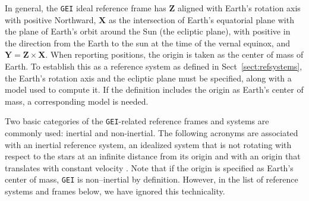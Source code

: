 \documentclass[draft]{agujournal2019}
\begin{document}
In general, the \texttt{GEI} ideal reference frame has $\mathbf{Z}$ aligned with Earth's rotation axis with positive Northward, $\mathbf{X}$ as the intersection of Earth's equatorial plane with the plane of Earth's orbit around the Sun (the ecliptic plane), with positive in the direction from the Earth to the sun at the time of the vernal equinox, and $\mathbf{Y}=\mathbf{Z}\times\mathbf{X}$. When reporting positions, the origin is taken as the center of mass of Earth. To establish this as a reference system as defined in Sect~\ref{sect:refsystems}, the Earth's rotation axis and the ecliptic plane must be specified, along with a model used to compute it. If the definition includes the origin as Earth's center of mass, a corresponding model is needed.

Two basic categories of the \texttt{GEI}-related reference frames and systems are commonly used: inertial and non-inertial. The following acronyms are associated with an inertial reference system, an idealized system that is not rotating with respect to the stars at an infinite distance from its origin and with an origin that translates with constant velocity \cite{NAIFOverview2023}. Note that if the origin is specified as Earth's center of mass, \texttt{GEI} is non--inertial by definition. However, in the list of reference systems and frames below, we have ignored this technicality.

\end{document}
